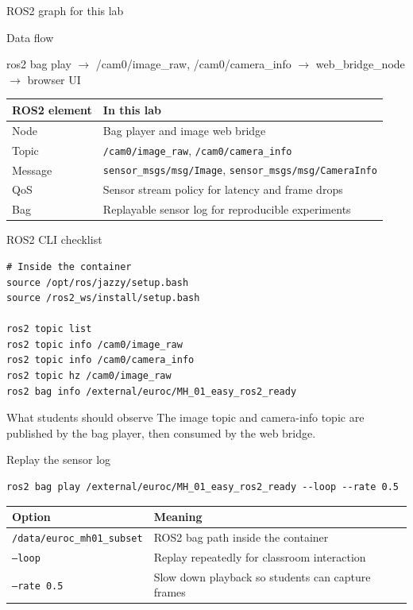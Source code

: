 \documentclass[aspectratio=169,10pt]{beamer}
\newcommand{\source}[1]{\vspace{0.25em}{\tiny\color{labgray}Source: #1}}
\newcommand{\code}[1]{\texttt{#1}}
\begin{document}
\begin{frame}{ROS2 graph for this lab}
  \begin{block}{Data flow}
    \begin{center}
      \ttfamily
      ros2 bag play $\rightarrow$ /cam0/image\_raw, /cam0/camera\_info $\rightarrow$ web\_bridge\_node $\rightarrow$ browser UI
    \end{center}
  \end{block}
  \begin{tabularx}{\textwidth}{@{}l X@{}}
    \toprule
    ROS2 element & In this lab \\
    \midrule
    Node & Bag player and image web bridge \\
    Topic & \code{/cam0/image\_raw}, \code{/cam0/camera\_info} \\
    Message & \code{sensor\_msgs/msg/Image}, \code{sensor\_msgs/msg/CameraInfo} \\
    QoS & Sensor stream policy for latency and frame drops \\
    Bag & Replayable sensor log for reproducible experiments \\
    \bottomrule
  \end{tabularx}
\end{frame}

\begin{frame}[fragile]{ROS2 CLI checklist}
  \begin{lstlisting}
# Inside the container
source /opt/ros/jazzy/setup.bash
source /ros2_ws/install/setup.bash

ros2 topic list
ros2 topic info /cam0/image_raw
ros2 topic info /cam0/camera_info
ros2 topic hz /cam0/image_raw
ros2 bag info /external/euroc/MH_01_easy_ros2_ready
  \end{lstlisting}
  \vspace{0.8em}
  \begin{block}{What students should observe}
    The image topic and camera-info topic are published by the bag player, then consumed by the web bridge.
  \end{block}
\end{frame}

\begin{frame}[fragile]{Replay the sensor log}
  \begin{lstlisting}
ros2 bag play /external/euroc/MH_01_easy_ros2_ready --loop --rate 0.5
  \end{lstlisting}
  \vspace{0.8em}
  \begin{tabularx}{\textwidth}{@{}l X@{}}
    \toprule
    Option & Meaning \\
    \midrule
    \code{/data/euroc\_mh01\_subset} & ROS2 bag path inside the container \\
    \code{--loop} & Replay repeatedly for classroom interaction \\
    \code{--rate 0.5} & Slow down playback so students can capture frames \\
    \bottomrule
  \end{tabularx}
  \source{ROS2 bag tutorial}
\end{frame}
\end{document}
